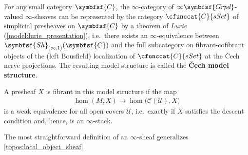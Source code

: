         \begin{property}\label{topos:cech_model_structure}
            For any small category $\symbfsf{C}$, the $\infty$-category of $\infty\symbfsf{Grpd}$-valued $\infty$-sheaves can be represented by the category $\cfunccat{C}{sSet}$ of simplicial presheaves on $\symbfsf{C}$ by a theorem of \textit{Lurie} (\cref{model:lurie_presentation}), i.e.~there exists an $\infty$-equivalence between $\symbfsf{Sh}_{(\infty,1)}(\symbfsf{C})$ and the full subcategory on fibrant-cofibrant objects of the (left Bousfield) localization of $\cfunccat{C}{sSet}$ at the \v{C}ech nerve projections. The resulting model structure is called the \textbf{\v{C}ech model structure}.
    
            A presheaf $X$ is fibrant in this model structure if the map
            \begin{gather}
                \hom(M,X)\rightarrow\hom\bigl(\mathcal{C}(\mathcal{U}),X\bigr)
            \end{gather}
            is a weak equivalence for all open covers $\mathcal{U}$, i.e.~exactly if $X$ satisfies the descent condition and, hence, is an $\infty$-stack.
        \end{property}
    
        The most straightforward definition of an $\infty$-sheaf generalizes \cref{topos:local_object_sheaf}.
    
